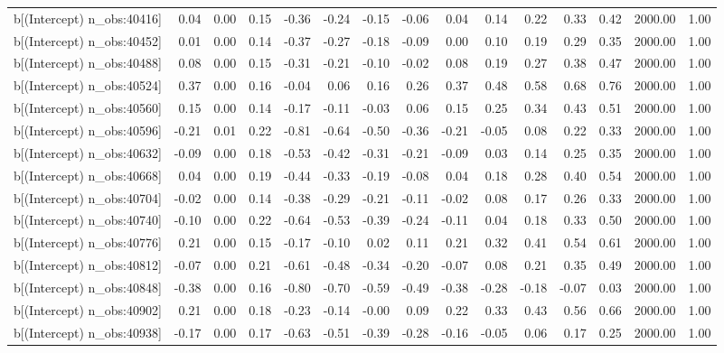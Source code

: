 \begin{table}[ht]
\begin{tabular}{rrrrrrrrrrrrrrr}
  b[(Intercept) n\_obs:40416] & 0.04 & 0.00 & 0.15 & -0.36 & -0.24 & -0.15 & -0.06 & 0.04 & 0.14 & 0.22 & 0.33 & 0.42 & 2000.00 & 1.00 \\ 
  b[(Intercept) n\_obs:40452] & 0.01 & 0.00 & 0.14 & -0.37 & -0.27 & -0.18 & -0.09 & 0.00 & 0.10 & 0.19 & 0.29 & 0.35 & 2000.00 & 1.00 \\ 
  b[(Intercept) n\_obs:40488] & 0.08 & 0.00 & 0.15 & -0.31 & -0.21 & -0.10 & -0.02 & 0.08 & 0.19 & 0.27 & 0.38 & 0.47 & 2000.00 & 1.00 \\ 
  b[(Intercept) n\_obs:40524] & 0.37 & 0.00 & 0.16 & -0.04 & 0.06 & 0.16 & 0.26 & 0.37 & 0.48 & 0.58 & 0.68 & 0.76 & 2000.00 & 1.00 \\ 
  b[(Intercept) n\_obs:40560] & 0.15 & 0.00 & 0.14 & -0.17 & -0.11 & -0.03 & 0.06 & 0.15 & 0.25 & 0.34 & 0.43 & 0.51 & 2000.00 & 1.00 \\ 
  b[(Intercept) n\_obs:40596] & -0.21 & 0.01 & 0.22 & -0.81 & -0.64 & -0.50 & -0.36 & -0.21 & -0.05 & 0.08 & 0.22 & 0.33 & 2000.00 & 1.00 \\ 
  b[(Intercept) n\_obs:40632] & -0.09 & 0.00 & 0.18 & -0.53 & -0.42 & -0.31 & -0.21 & -0.09 & 0.03 & 0.14 & 0.25 & 0.35 & 2000.00 & 1.00 \\ 
  b[(Intercept) n\_obs:40668] & 0.04 & 0.00 & 0.19 & -0.44 & -0.33 & -0.19 & -0.08 & 0.04 & 0.18 & 0.28 & 0.40 & 0.54 & 2000.00 & 1.00 \\ 
  b[(Intercept) n\_obs:40704] & -0.02 & 0.00 & 0.14 & -0.38 & -0.29 & -0.21 & -0.11 & -0.02 & 0.08 & 0.17 & 0.26 & 0.33 & 2000.00 & 1.00 \\ 
  b[(Intercept) n\_obs:40740] & -0.10 & 0.00 & 0.22 & -0.64 & -0.53 & -0.39 & -0.24 & -0.11 & 0.04 & 0.18 & 0.33 & 0.50 & 2000.00 & 1.00 \\ 
  b[(Intercept) n\_obs:40776] & 0.21 & 0.00 & 0.15 & -0.17 & -0.10 & 0.02 & 0.11 & 0.21 & 0.32 & 0.41 & 0.54 & 0.61 & 2000.00 & 1.00 \\ 
  b[(Intercept) n\_obs:40812] & -0.07 & 0.00 & 0.21 & -0.61 & -0.48 & -0.34 & -0.20 & -0.07 & 0.08 & 0.21 & 0.35 & 0.49 & 2000.00 & 1.00 \\ 
  b[(Intercept) n\_obs:40848] & -0.38 & 0.00 & 0.16 & -0.80 & -0.70 & -0.59 & -0.49 & -0.38 & -0.28 & -0.18 & -0.07 & 0.03 & 2000.00 & 1.00 \\ 
  b[(Intercept) n\_obs:40902] & 0.21 & 0.00 & 0.18 & -0.23 & -0.14 & -0.00 & 0.09 & 0.22 & 0.33 & 0.43 & 0.56 & 0.66 & 2000.00 & 1.00 \\ 
  b[(Intercept) n\_obs:40938] & -0.17 & 0.00 & 0.17 & -0.63 & -0.51 & -0.39 & -0.28 & -0.16 & -0.05 & 0.06 & 0.17 & 0.25 & 2000.00 & 1.00 \\ 

\end{tabular}
\end{table}
